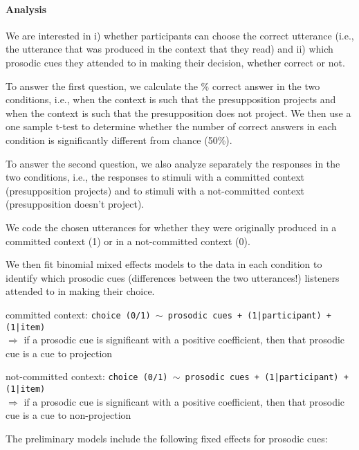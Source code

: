 \documentclass[dina4,12pt,fleqn]{article}
\newcommand{\6}{\mbox{$[\hspace*{-.6mm}[$}}
\newcommand{\9}{\mbox{$]\hspace*{-.6mm}]$}}
\begin{document}





\paragraph{Analysis} We are interested in i) whether participants can choose the correct utterance (i.e., the utterance that was produced in the context that they read) and ii) which prosodic cues they attended to in making their decision, whether correct or not. 

To answer the first question, we calculate the \% correct answer in the two conditions, i.e., when the context is such that the presupposition projects and when the context is such that the presupposition does not project. We then use a one sample t-test to determine whether the number of correct answers in each condition is significantly different from chance (50\%).

To answer the second question, we also analyze separately the responses in the two conditions, i.e., the responses to stimuli with a committed context (presupposition projects) and to stimuli with a not-committed context (presupposition doesn't project).

We code the chosen utterances for whether they were originally produced in a committed context (1) or in a not-committed context (0). 

We then fit binomial mixed effects models to the data in each condition to identify which prosodic cues (differences between the two utterances!) listeners attended to in making their choice.

committed context: {\tt choice (0/1) $\sim$ prosodic cues + (1|participant)  + (1|item) }
\\ $\Longrightarrow$ if a prosodic cue is significant with a positive coefficient, then that prosodic cue is a cue to projection

not-committed context: {\tt choice (0/1) $\sim$ prosodic cues + (1|participant)  + (1|item) }
\\ $\Longrightarrow$ if a prosodic cue is significant with a positive coefficient, then that prosodic cue is a cue to non-projection

\medskip

The preliminary models include the following fixed effects for prosodic cues:
\end{document}
